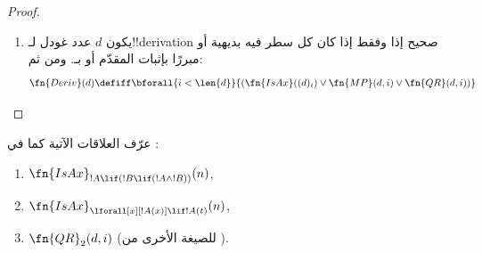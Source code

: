 \documentclass[../../../include/open-logic-section]{subfiles}
\begin{document}
\begin{proof}
\begin{enumerate}
\begin{enumerate}
  \item يشتمل السطر $i$ على $!B\lif\lforall[x][!A(x)]$، و
  \item يشتمل سطر ما $j<i$ على $!B\lif\Subst{!A}{c}{x}$ لثابت~$c$
  \item لا يرد في~$!B$.
  \end{enumerate}
  ويمكن اختبار هذه الشروط كلها عوديًا بدائيًا، لأن أعداد غودل
  لـ$!B$ و$!A(x)$ و$x$ أصغر من عدد غودل للصيغة في السطر~$i$، وعدد
  غودل لـ$c$ أصغر من عدد غودل للصيغة في السطر~$j$:
  \begin{multline*}
    \fn{QR}_1(d, i) \defiff \bexists{j<i}{\bexists{b < (d)_i}{\bexists{x <
        (d)_i}{\bexists{a < (d)_i}{\bexists{c < (d)_j}{(}}}}}
    \\ \fn{Var}(x) \land \fn{Const}(c) \land {} \\
    (d)_i = \Gn{(} \concat
    b \concat \Gn{\lif} \concat \Gn{\lforall} \concat x \concat a
    \concat \Gn{)} \land {}\\
    (d)_j = \Gn{(} \concat b \concat
    \Gn{\lif} \concat \fn{Subst}(a,c,x) \concat \Gn{)} \land {}\\ \fn{Sent}(b)
    \land \fn{Sent}(\fn{Subst}(a,c,x)) \land {} \bforall{k <
      \len{b}}{(b)_k \neq (c)_0})
  \end{multline*}
  وهنا نفترض أن $c$ و$x$ هما عددا غودل للثابت والمتغير بوصفهما حدين
  (لا شفرتي رمزيهما). ونختبر أن $x$ هو المتغير الحر الوحيد في~$!A(x)$
  باختبار ما إذا كانت $\Subst{!A(x)}{c}{x}$ !!a{sentence}، ونضمن عدم
  ورود $c$ في $!B$ باشتراط اختلاف كل رمز في~$!B$ عن~$c$.

  ونترك الصيغة الأخرى من \QR{} تمرينًا.
\item يكون $d$ عدد غودل لـ!!{derivation} صحيح إذا وفقط إذا كان كل سطر
  فيه بديهية أو مبررًا بإثبات المقدّم أو بـ\QR. ومن ثم:
  \[
  \fn{Deriv}(d) \defiff \bforall{i < \len{d}}{(\fn{IsAx}((d)_i) \lor
    \fn{MP}(d,i) \lor \fn{QR}(d, i))}
  \]
\end{enumerate}
\end{proof}

\begin{prob}
عرّف العلاقات الآتية كما في
:
\begin{enumerate}
\item $\fn{IsAx}_{!A \lif (!B \lif (!A \land !B))}(n)$,
\item $\fn{IsAx}_{\lforall[x][!A(x)] \lif !A(t)}(n)$,
\item $\fn{QR}_{2}(d, i)$ (للصيغة الأخرى من \QR).
\end{enumerate}
\end{prob}
\end{document}
